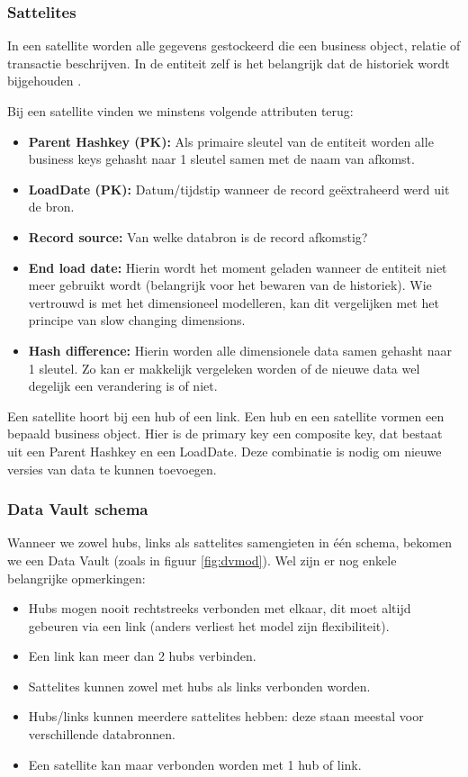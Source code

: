 \subsubsection{Sattelites}
In een satellite worden alle gegevens gestockeerd die een business object, relatie of transactie beschrijven. In de entiteit zelf is het belangrijk dat de historiek wordt bijgehouden \autocite{Linstedt2016}.

Bij een satellite vinden we minstens volgende attributen terug:

\begin{itemize}
	\item \textbf{Parent Hashkey (PK):} Als primaire sleutel van de entiteit worden alle business keys gehasht naar 1 sleutel samen met de naam van afkomst.
	\item \textbf{LoadDate (PK):} Datum/tijdstip wanneer de record geëxtraheerd werd uit de bron.
	\item \textbf{Record source:} Van welke databron is de record afkomstig?
	\item \textbf{End load date:} Hierin wordt het moment geladen wanneer de entiteit niet meer gebruikt wordt (belangrijk voor het bewaren van de historiek). Wie vertrouwd is met het dimensioneel modelleren, kan dit vergelijken met het principe van slow changing dimensions.
	\item \textbf{Hash difference:} Hierin worden alle dimensionele data samen gehasht naar 1 sleutel. Zo kan er makkelijk vergeleken worden of de nieuwe data wel degelijk een verandering is of niet.
\end{itemize} 

Een satellite hoort bij een hub of een link. Een hub en een satellite vormen een bepaald business object. Hier is de primary key een composite key, dat bestaat uit een Parent Hashkey en een LoadDate. Deze combinatie is nodig om nieuwe versies van data te kunnen toevoegen.

\subsubsection{Data Vault schema}
Wanneer we zowel hubs, links als sattelites samengieten in één schema, bekomen we een Data Vault (zoals in figuur \ref{fig:dvmod}). Wel zijn er nog enkele belangrijke opmerkingen:

\begin{itemize}
	\item Hubs mogen nooit rechtstreeks verbonden met elkaar, dit moet altijd gebeuren via een link (anders verliest het model zijn flexibiliteit).
	\item Een link kan meer dan 2 hubs verbinden.
	\item Sattelites kunnen zowel met hubs als links verbonden worden.
	\item Hubs/links kunnen meerdere sattelites hebben: deze staan meestal voor verschillende databronnen.
	\item Een satellite kan maar verbonden worden met 1 hub of link. 
\end{itemize} 

